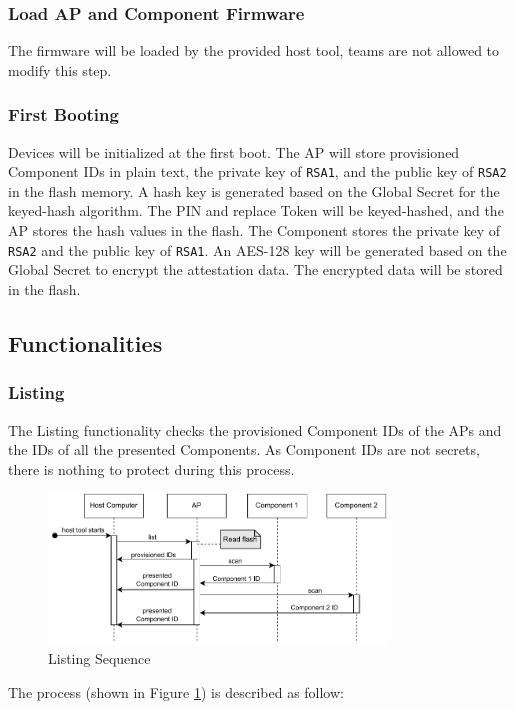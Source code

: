 \documentclass[11pt,oneside,onecolumn,letterpaper]{article}
\newcounter{alg}
\begin{document}
	\subsubsection{Load AP and Component Firmware}
	The firmware will be loaded by the provided host tool,
	teams are not allowed to modify this step.
	
	\subsubsection{First Booting}
	Devices will be initialized at the first boot.
	The AP will store provisioned Component IDs in plain text,
	the private key of \texttt{RSA1},
	and the public key of \texttt{RSA2} in the flash memory.
	A hash key is generated based on the Global Secret for the keyed-hash algorithm.
	The PIN and replace Token will be keyed-hashed,
	and the AP stores the hash values in the flash.
	The Component stores the private key of \texttt{RSA2} and the public key of \texttt{RSA1}.
	An AES-128 key will be generated based on the Global Secret to encrypt the attestation data.
	The encrypted data will be stored in the flash.
	
	\subsection{Functionalities}
	\subsubsection{Listing}
	The Listing functionality checks the provisioned Component IDs of the APs and the IDs of all the presented Components.
	As Component IDs are not secrets,
	there is nothing to protect during this process.
	
	\begin{figure}[h]
		\centering
		\includegraphics[width=0.8\textwidth]{pics/list.pdf}
		\caption{Listing Sequence}
		\label{fig:functionality_list}
	\end{figure}
	
	The process (shown in Figure \ref{fig:functionality_list}) is described as follow:
	
\end{document}

